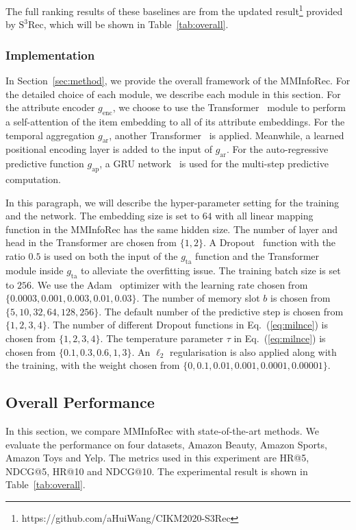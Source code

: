 \documentclass[conference]{IEEEtran}
\begin{document}
The full ranking results of these baselines are from the updated result\footnote{https://github.com/aHuiWang/CIKM2020-S3Rec} provided by $\text{S}^3\text{Rec}$, which will be shown in Table~\ref{tab:overall}.

\subsubsection{Implementation}
\label{sec:imple}
In Section~\ref{sec:method}, we provide the overall framework of the MMInfoRec. For the detailed choice of each module, we describe each module in this section. For the attribute encoder $g_\text{enc}$, we choose to use the Transformer~\cite{attention} module to perform a self-attention of the item embedding to all of its attribute embeddings. For the temporal aggregation $g_\text{ar}$, another Transformer~\cite{attention} is applied. Meanwhile, a learned positional encoding layer is added to the input of $g_\text{ar}$. For the auto-regressive predictive function $g_\text{ap}$, a GRU network~\cite{gru} is used for the multi-step predictive computation.

In this paragraph, we will describe the hyper-parameter setting for the training and the network. The embedding size is set to $64$ with all linear mapping function in the MMInfoRec has the same hidden size. The number of layer and head in the Transformer are chosen from $\{1,2\}$. A Dropout~\cite{dropout} function with the ratio $0.5$ is used on both the input of the $g_\text{ta}$ function and the Transformer module inside $g_\text{ta}$ to alleviate the overfitting issue. The training batch size is set to $256$. We use the Adam~\cite{adam} optimizer with the learning rate chosen from $\{0.0003,0.001,0.003,0.01,0.03\}$. The number of memory slot $b$ is chosen from $\{5,10,32,64,128,256\}$. The default number of the predictive step is chosen from $\{1,2,3,4\}$. The number of different Dropout functions in Eq.~(\ref{eq:milnce}) is chosen from $\{1,2,3,4\}$. The temperature parameter $\tau$ in Eq.~(\ref{eq:milnce}) is chosen from $\{0.1,0.3,0.6,1,3\}$. An $\ell_2$ regularisation is also applied along with the training, with the weight chosen from $\{0,0.1,0.01,0.001,0.0001,0.00001\}$.

\subsection{Overall Performance}
\label{sec:overall-exp}
In this section, we compare MMInfoRec with state-of-the-art methods. We evaluate the performance on four datasets, Amazon Beauty, Amazon Sports, Amazon Toys and Yelp. The metrics used in this experiment are HR@5, NDCG@5, HR@10 and NDCG@10. The experimental result is shown in Table~\ref{tab:overall}.
\end{document}
